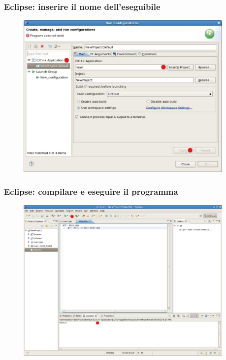 \documentclass{beamer}
\begin{document}

\begin{frame}[fragile]

    \frametitle{Eclipse: inserire il nome dell'eseguibile}

    \begin{figure}
        \centering
        \includegraphics[width=0.95\textwidth]{./images/eclipse10}
    \end{figure}

\end{frame}


\begin{frame}[fragile]

    \frametitle{Eclipse: compilare e eseguire il programma}

    \begin{figure}
        \centering
        \includegraphics[width=0.95\textwidth]{./images/eclipse11}
    \end{figure}

\end{frame}
\end{document}
